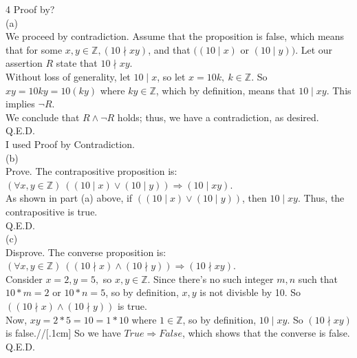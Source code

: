 \documentclass{article}
\begin{document}
{\Large 4 Proof by?} \\[.3cm]
(a) \\[.15cm]
We proceed by contradiction. Assume that the proposition is false, which means that for some $x,y\in\mathbb{Z}, (10\nmid xy)$, and that $((10\mid x)$ or $(10\mid y))$. Let our assertion $R$ state that $10\nmid xy$.\\[.1cm]
Without loss of generality, let $10\mid x$, so let $x = 10k,\ k\in\mathbb{Z}$. So $xy = 10ky = 10(ky)$ where $ky\in\mathbb{Z}$, which by definition, means that $10\mid xy$. This implies $\neg R$.\\[.1cm]
We conclude that $R\land\neg R$ holds; thus, we have a contradiction, as desired.\\[.1cm]
Q.E.D.\\[.15cm]
I used Proof by Contradiction.\\[.3cm]
(b) \\[.15cm]
Prove. The contrapositive proposition is: $(\forall x,y\in\mathbb{Z})\ ((10\mid x)\lor (10\mid y))\Longrightarrow (10\mid xy)$.\\[.15cm]
As shown in part (a) above, if $((10\mid x)\lor (10\mid y))$, then $10\mid xy$. Thus, the contrapositive is true.\\[.1cm]
Q.E.D.\\[.3cm]
(c) \\[.15cm]
Disprove. The converse proposition is: $(\forall x,y\in\mathbb{Z})\ ((10\nmid x)\land (10\nmid y))\Longrightarrow (10\nmid xy)$.\\[.15cm]
Consider $x = 2, y = 5,$ so $x,y\in\mathbb{Z}$. Since there's no such integer $m,n$ such that $10 * m = 2$ or $10 * n = 5$, so by definition, $x, y$ is not divisble by 10. So $((10\nmid x)\land (10\nmid y))$ is true.\\[.1cm]
Now, $xy = 2*5 = 10 = 1*10$ where $1\in\mathbb{Z}$, so by definition, $10\mid xy$. So $(10\nmid xy)$ is false.//[.1cm]
So we have $True\Longrightarrow False$, which shows that the converse is false.\\[.1cm]
Q.E.D.
\end{document}
